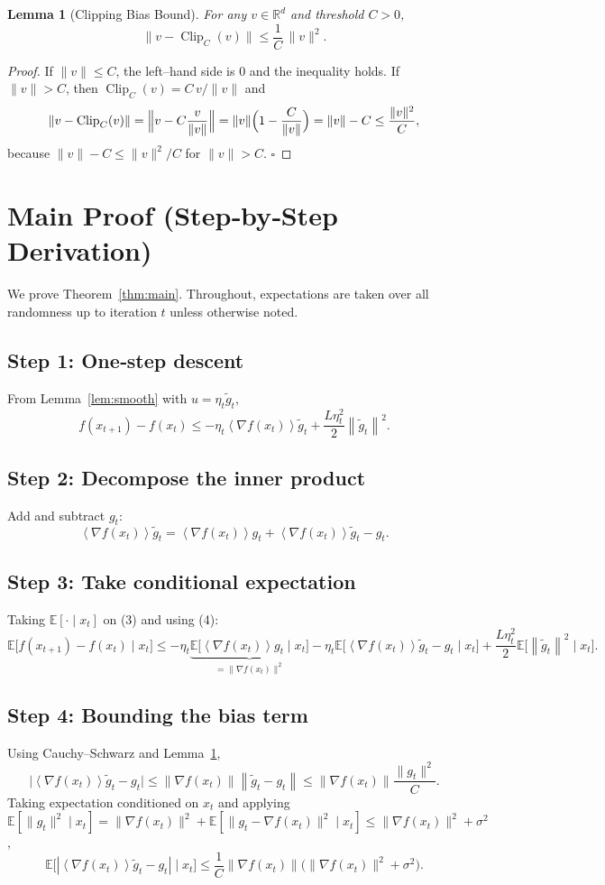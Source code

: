 \documentclass{article}
\newtheorem{lemma}{Lemma}
\newcommand{\E}{\mathbb{E}}
\newcommand{\norm}[1]{\left\lVert #1\right\rVert}
\newcommand{\inner}[1]{\left\langle #1\right\rangle}
\begin{document}
\begin{lemma}[Clipping Bias Bound]\label{lem:bias}
For any $v\in\mathbb{R}^d$ and threshold $C>0$,
\[
\|v-\operatorname{Clip}_C(v)\|\le \frac{1}{C}\,\|v\|^2 .
\]
\end{lemma}
\begin{proof}
If $\|v\|\le C$, the left–hand side is $0$ and the inequality holds.
If $\|v\|>C$, then $\operatorname{Clip}_C(v)=C\,v/\|v\|$ and
\[
\|v-\operatorname{Clip}_C(v)\|
= \Bigl\|v-C\frac{v}{\|v\|}\Bigr\|
= \|v\|\Bigl(1-\frac{C}{\|v\|}\Bigr)
= \|v\|-C
\le \frac{\|v\|^2}{C},
\]
because $\|v\|-C\le \|v\|^2/C$ for $\|v\|>C$. \hfill $\square$
\end{proof}

\section*{Main Proof (Step‑by‑Step Derivation)}
We prove Theorem~\ref{thm:main}. Throughout, expectations are taken over all randomness up to iteration $t$ unless otherwise noted.

\subsection*{Step 1: One‑step descent}
From Lemma~\ref{lem:smooth} with $u=\eta_t\tilde g_t$,
\[
f(x_{t+1})-f(x_t)\le
-\eta_t\inner{\nabla f(x_t)}{\tilde g_t}
+\frac{L\eta_t^{2}}{2}\norm{\tilde g_t}^{2}. \tag{3}
\]
\subsection*{Step 2: Decompose the inner product}
Add and subtract $g_t$:
\[
\inner{\nabla f(x_t)}{\tilde g_t}
= \inner{\nabla f(x_t)}{g_t}
+\inner{\nabla f(x_t)}{\tilde g_t-g_t}. \tag{4}
\]
\subsection*{Step 3: Take conditional expectation}
Taking $\E[\cdot\mid x_t]$ on (3) and using (4):
\[
\E\!\bigl[f(x_{t+1})-f(x_t)\mid x_t\bigr]
\le
-\eta_t\underbrace{\E\!\bigl[\inner{\nabla f(x_t)}{g_t}\mid x_t\bigr]}_{= \|\nabla f(x_t)\|^{2}}
-\eta_t\E\!\bigl[\inner{\nabla f(x_t)}{\tilde g_t-g_t}\mid x_t\bigr]
+\frac{L\eta_t^{2}}{2}\E\!\bigl[\norm{\tilde g_t}^{2}\mid x_t\bigr]. \tag{5}
\]

\subsection*{Step 4: Bounding the bias term}
Using Cauchy–Schwarz and Lemma~\ref{lem:bias},
\[
\bigl|\inner{\nabla f(x_t)}{\tilde g_t-g_t}\bigr|
\le \norm{\nabla f(x_t)}\norm{\tilde g_t-g_t}
\le \norm{\nabla f(x_t)}\frac{\|g_t\|^{2}}{C}. \tag{6}
\]
Taking expectation conditioned on $x_t$ and applying $\E[\|g_t\|^{2}\mid x_t]=\|\nabla f(x_t)\|^{2}+\E[\|g_t-\nabla f(x_t)\|^{2}\mid x_t]\le \|\nabla f(x_t)\|^{2}+\sigma^{2}$,
\[
\E\!\bigl[|\inner{\nabla f(x_t)}{\tilde g_t-g_t}|\mid x_t\bigr]
\le \frac{1}{C}\norm{\nabla f(x_t)}\bigl(\|\nabla f(x_t)\|^{2}+\sigma^{2}\bigr). \tag{7}
\]
\end{document}

